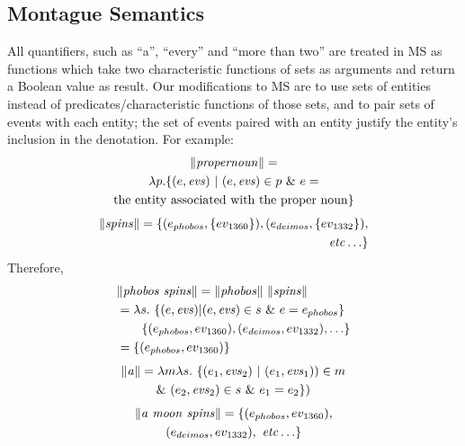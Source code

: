 \documentclass[../main.tex]{subfiles}
\begin{document}
\begin{refsection}
\subsection{Montague Semantics}

All quantifiers, such as ``a'', ``every'' and ``more than two'' are treated in MS as functions which take two characteristic functions of sets as arguments and return a Boolean value as result. Our modifications to MS are to use sets of entities instead of predicates/characteristic functions of those sets, and to pair sets of events with each entity; the set of events paired with an entity justify the entity’s inclusion in the denotation. For example:
\begin{multline*}
	\lVert \mathit{propernoun} \rVert = \\ \lambda p.
	\{(e, \mathit{evs})\ |\ (e, \mathit{evs}) \in p\ \&\ e = \\ \mathrm{the\ entity\ associated\ with\ the\ proper\ noun}\}
\end{multline*}
\begin{equation*}
	\begin{split}
		\lVert \mathit{spins} \rVert = \{(e_{phobos}, \{ev_{\mathrm{1360}}\}),
		(e_{deimos}, \{ev_{\mathrm{1332}}\}), \\ \mathit{etc}\ldots\}
	\end{split}
\end{equation*}
Therefore,
\begin{equation*}
	\begin{split}
		& \lVert \mathit{phobos\ spins} \rVert = \lVert \mathit{phobos} \rVert\ \lVert \mathit{spins} \rVert \\
		& = \lambda s.\ \{(e, \mathit{evs}) | (e, \mathit{evs}) \in s\ \&\ e = e_{phobos}\} \\
		& \qquad \{(e_{phobos},{ev_{\mathrm{1360}}}), (e_{deimos}, ev_{\mathrm{1332}}), \ldots\} \\
		& = \{(e_{phobos}, ev_{\mathrm{1360}})\}
	\end{split}
\end{equation*}
\begin{multline*} %
	\meaningof{a} = \lambda m \lambda s.\ \{(e_1,\evs_2)\ |\ (e_1,\evs_1) )\in m \\
	\&\ (e_2,\evs_2) \in s\ \&\ e_1 = e_2\})
\end{multline*}
\begin{multline*}
	\lVert \mathit{a\ moon\ spins} \rVert =
	\{(e_{phobos}, ev_{\mathrm{1360}}), \\ (e_{deimos}, ev_{\mathrm{1332}}),\ \mathit{etc}\ldots\}
\end{multline*}


\end{refsection}
\end{document}

